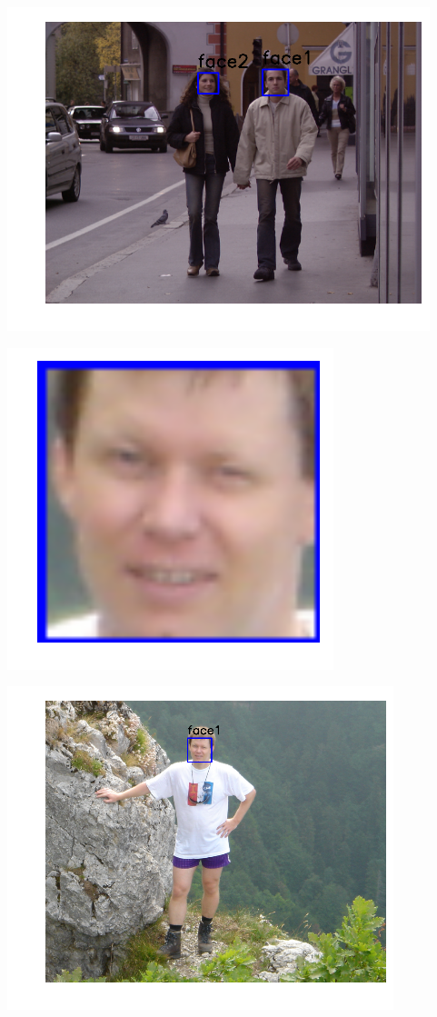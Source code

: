 \includegraphics{facedetection_files/facedetection_59_4.png}

\includegraphics{facedetection_files/facedetection_59_5.png}

\includegraphics{facedetection_files/facedetection_59_6.png}

